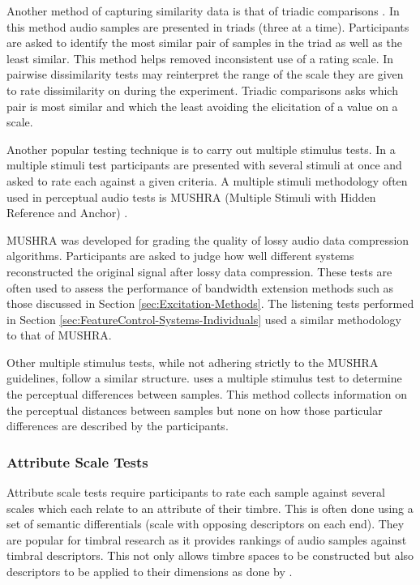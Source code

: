 			Another method of capturing similarity data is that of triadic comparisons
			\citep{wickelmaier2007deriving}.  In this method audio samples are presented in triads (three at a
			time).  Participants are asked to identify the most similar pair of samples in the triad as well as
			the least similar. This method helps removed inconsistent use of a rating scale. In pairwise
			dissimilarity tests may reinterpret the range of the scale they are given to rate dissimilarity on
			during the experiment. Triadic comparisons asks which pair is most similar and which the least
			avoiding the elicitation of a value on a scale.

			Another popular testing technique is to carry out multiple stimulus tests. In a multiple stimuli
			test participants are presented with several stimuli at once and asked to rate each against a given
			criteria. A multiple stimuli methodology often used in perceptual audio tests is MUSHRA (Multiple
			Stimuli with Hidden Reference and Anchor) \citep{mushra2014}. 

			MUSHRA was developed for grading the quality of lossy audio data compression algorithms.
			Participants are asked to judge how well different systems reconstructed the original signal after
			lossy data compression.  These tests are often used to assess the performance of bandwidth extension
			methods such as those discussed in Section \ref{sec:Excitation-Methods}. The listening tests
			performed in Section \ref{sec:FeatureControl-Systems-Individuals} used a similar methodology to that
			of MUSHRA.

			Other multiple stimulus tests, while not adhering strictly to the MUSHRA guidelines, follow a
			similar structure. \citet{arthi2015influence} uses a multiple stimulus test to determine the
			perceptual differences between samples. This method collects information on the perceptual distances
			between samples but none on how those particular differences are described by the participants.

		\subsubsection*{Attribute Scale Tests}
			Attribute scale tests require participants to rate each sample against several scales which each
			relate to an attribute of their timbre. This is often done using a set of semantic differentials
			(scale with opposing descriptors on each end). They are popular for timbral research as it provides
			rankings of audio samples against timbral descriptors. This not only allows timbre spaces to be
			constructed but also descriptors to be applied to their dimensions as done by
			\citet{zacharakis2014an}.

